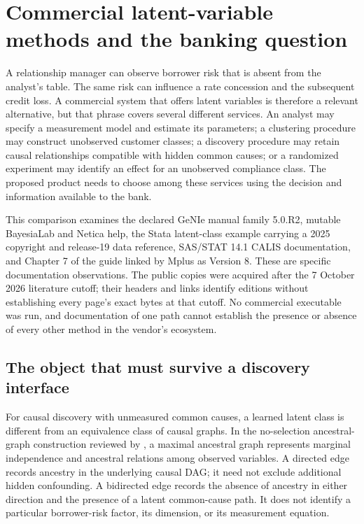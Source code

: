 \hypertarget{commercial-latent-variable-methods-and-the-banking-question}{%
\section{Commercial latent-variable methods and the banking
question}\label{commercial-latent-variable-methods-and-the-banking-question}}

\label{exec13:latent-commercial}

A relationship manager can observe borrower risk that is absent from the
analyst's table. The same risk can influence a rate concession and the
subsequent credit loss. A commercial system that offers latent variables
is therefore a relevant alternative, but that phrase covers several
different services. An analyst may specify a measurement model and
estimate its parameters; a clustering procedure may construct unobserved
customer classes; a discovery procedure may retain causal relationships
compatible with hidden common causes; or a randomized experiment may
identify an effect for an unobserved compliance class. The proposed
product needs to choose among these services using the decision and
information available to the bank.

This comparison examines the declared GeNIe manual family 5.0.R2,
mutable BayesiaLab and Netica help, the Stata latent-class example
carrying a 2025 copyright and release-19 data reference, SAS/STAT 14.1
CALIS documentation, and Chapter 7 of the guide linked by Mplus as
Version 8. These are specific documentation observations. The public
copies were acquired after the 7 October 2026 literature cutoff; their
headers and links identify editions without establishing every page's
exact bytes at that cutoff. No commercial executable was run, and
documentation of one path cannot establish the presence or absence of
every other method in the vendor's ecosystem.
\citep{exec13_genie_readme,exec13_latent_genie_parameters,
exec13_latent_bayesia_data,exec13_latent_netica_structure,
exec13_latent_stata_lca,exec13_latent_sas_calis,exec13_latent_mplus}

\hypertarget{the-object-that-must-survive-a-discovery-interface}{%
\subsection{The object that must survive a discovery
interface}\label{the-object-that-must-survive-a-discovery-interface}}

For causal discovery with unmeasured common causes, a learned latent
class is different from an equivalence class of causal graphs. In the
no-selection ancestral-graph construction reviewed by
\citet[Section 3]{zhang2008}, a maximal ancestral graph represents
marginal independence and ancestral relations among observed variables.
A directed edge records ancestry in the underlying causal DAG; it need
not exclude additional hidden confounding. A bidirected edge records the
absence of ancestry in either direction and the presence of a latent
common-cause path. It does not identify a particular borrower-risk
factor, its dimension, or its measurement equation.

